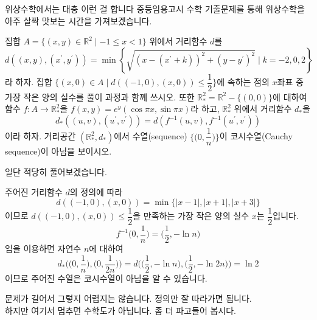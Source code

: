 \documentclass[serif]{beamer}
\begin{document}
\begin{frame}{위상수학에서는 대충 이런 걸 합니다}
    중등임용고시 수학 기출문제를 통해 위상수학을 아주 살짝 맛보는 시간을 가져보겠습니다.

    \begin{hint}[2026학년도 전공 A 12번]
        집합 $A=\{(x,y)\in\mathbb R^2\mid -1\leq x<1\}$ 위에서 거리함수 $d$를
        \[
            d((x,y),(x^\prime,y^\prime))=\min\left\{\sqrt{(x-(x^\prime+k))^2+(y-y^\prime)^2}\mid k=-2,0,2\right\}
        \]
        라 하자. 집합 $\biggl\{(x,0)\in A\mid d((-1,0),(x,0))\leq\dfrac{1}{2}\biggr\}$에 속하는 점의 $x$좌표 중 가장 작은 양의 실수를 풀이 과정과 함께 쓰시오.
        또한 $\mathbb R^2_*=\mathbb R^2-\{(0,0)\}$에 대하여 함수 $f:A\to\mathbb R^2_*$을 $f(x,y)=e^y(\cos\pi x,\sin\pi x)$라 하고, $\mathbb R^2_*$ 위에서 거리함수 $d_*$을
        \[
            d_*((u,v),(u^\prime,v^\prime))=d(f^{-1}(u,v),f^{-1}(u^\prime,v^\prime))
        \]
        이라 하자. 거리공간 $(\mathbb R^2_*,d_*)$에서 수열(sequence) $\biggl\{\biggl(0,\dfrac{1}{n}\biggr)\biggr\}$이 코시수열(Cauchy sequence)이 아님을 보이시오.
    \end{hint}
\end{frame}

\begin{frame}
    일단 적당히 풀어보겠습니다.
    \begin{hint}
        주어진 거리함수 $d$의 정의에 따라
        \[
            d((-1,0),(x,0))=\min\{\vert x-1\vert,\vert x+1\vert,\vert x+3\vert\}
        \]
        이므로 $d((-1,0),(x,0))\leq\dfrac{1}{2}$을 만족하는 가장 작은 양의 실수 $x$는 $\dfrac{1}{2}$입니다.
        \[
            f^{-1}\biggl(0,\frac{1}{n}\biggr)=\biggl(\frac{1}{2},-\ln n\biggr)
        \]
        임을 이용하면 자연수 $n$에 대하여
        \[
            d_*\biggl(\biggl(0,\frac{1}{n}\biggr),\biggl(0,\frac{1}{2n}\biggr)\biggr)=d\biggl(\biggl(\frac{1}{2},-\ln n\biggr),\biggl(\frac{1}{2},-\ln 2n\biggr)\biggr)=\ln 2
        \]
        이므로 주어진 수열은 코시수열이 아님을 알 수 있습니다.
    \end{hint}
    문제가 길어서 그렇지 어렵지는 않습니다. 정의만 잘 따라가면 됩니다. \\
    하지만 여기서 멈추면 수학도가 아닙니다. 좀 더 파고들어 봅시다.
\end{frame}
\end{document}
